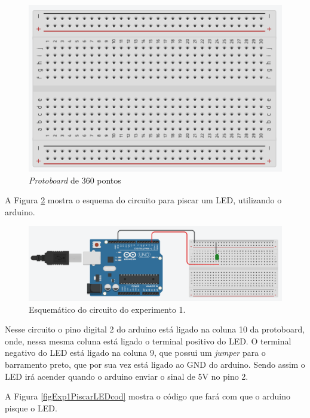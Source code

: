 \documentclass[12pt]{article}
\begin{document}
	\begin{figure}[h!]
		\centering
		\includegraphics[scale=0.5]{Imagens/figProtoboard.png}
		\caption{\textit{Protoboard} de 360 pontos}
		\label{figProtoboard}
	\end{figure}

	A Figura \ref{figExp1PiscarLEDesq} mostra o esquema do circuito para piscar um LED, utilizando o arduino.

	\begin{figure}[h!]
		\centering
		\includegraphics[scale=0.3]{Imagens/Experimentos/1-PiscarLED/1-PiscarLED.png}
		\caption{Esquemático do circuito do experimento 1.}
		\label{figExp1PiscarLEDesq}
	\end{figure}

	Nesse circuito o pino digital 2 do arduino está ligado na coluna 10 da protoboard, onde, nessa mesma coluna está ligado o terminal positivo do LED. O terminal negativo do LED está ligado na coluna 9, que possui um \textit{jumper} para o barramento preto, que por sua vez está ligado ao GND do arduino. Sendo assim o LED irá acender quando o arduino enviar o sinal de 5V no pino 2.

	A Figura \ref{figExp1PiscarLEDcod} mostra o código que fará com que o arduino pisque o LED.
\end{document}
